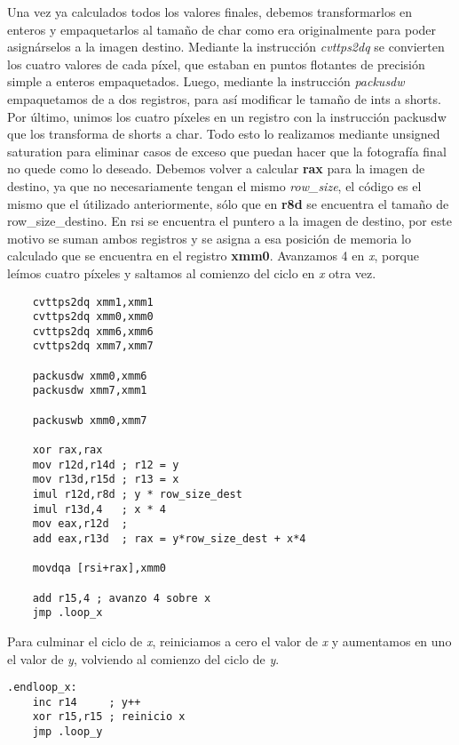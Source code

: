 \documentclass[a4paper]{article}
\begin{document}
\indent Una vez ya calculados todos los valores finales, debemos transformarlos en enteros y empaquetarlos al tama\~no de char como era originalmente para poder asign\'arselos a la imagen destino. Mediante la instrucci\'on \textit{cvttps2dq} se convierten los cuatro valores de cada p\'ixel, que estaban en puntos flotantes de precisi\'on simple a enteros empaquetados. Luego, mediante la instrucci\'on \textit{packusdw} empaquetamos de a dos registros, para as\'i modificar le tama\~no de ints a shorts. Por \'ultimo, unimos los cuatro p\'ixeles en un registro con la instrucci\'on packusdw que los transforma de shorts a char. Todo esto lo realizamos mediante unsigned saturation para eliminar casos de exceso que puedan hacer que la fotograf\'ia final no quede como lo deseado. Debemos volver a calcular \textbf{rax} para la imagen de destino, ya que no necesariamente tengan el mismo \textit{row_size}, el c\'odigo es el mismo que el \'utilizado anteriormente, s\'olo que en \textbf{r8d} se encuentra el tama\~no de row_size_destino. En rsi se encuentra el puntero a la imagen de destino, por este motivo se suman ambos registros y se asigna a esa posici\'on de memoria lo calculado que se encuentra en el registro \textbf{xmm0}. Avanzamos 4 en \emph{x}, porque le\'imos cuatro p\'ixeles y saltamos al comienzo del ciclo en \emph{x} otra vez.
 \begin{codesnippet}
\begin{verbatim}
    cvttps2dq xmm1,xmm1
    cvttps2dq xmm0,xmm0
    cvttps2dq xmm6,xmm6
    cvttps2dq xmm7,xmm7

    packusdw xmm0,xmm6
    packusdw xmm7,xmm1

    packuswb xmm0,xmm7

    xor rax,rax
    mov r12d,r14d ; r12 = y
    mov r13d,r15d ; r13 = x
    imul r12d,r8d ; y * row_size_dest
    imul r13d,4   ; x * 4
    mov eax,r12d  ; 
    add eax,r13d  ; rax = y*row_size_dest + x*4 

    movdqa [rsi+rax],xmm0

    add r15,4 ; avanzo 4 sobre x
    jmp .loop_x
\end{verbatim}
\end{codesnippet}

 \indent Para culminar el ciclo de \emph{x}, reiniciamos a cero el valor de \emph{x} y aumentamos en uno el valor de \emph{y}, volviendo al comienzo del ciclo de \emph{y}.
 \begin{codesnippet}
\begin{verbatim}
.endloop_x:
    inc r14     ; y++
    xor r15,r15 ; reinicio x
    jmp .loop_y
\end{verbatim}
\end{codesnippet}
\end{document}
